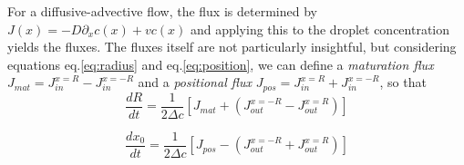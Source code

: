 \documentclass{Dissertate}
\begin{document}
For a diffusive-advective flow, the flux is determined by
\(J(x) = -D\partial_xc(x)+vc(x)\) and applying this to the droplet
concentration yields the fluxes. The fluxes itself are not particularly
insightful, but considering equations eq.\ref{eq:radius} and
eq.\ref{eq:position}, we can define a \emph{maturation flux}
\(J_{mat} = J_{in}^{x=R}-J_{in}^{x=-R}\) and a \emph{positional flux}
\(J_{pos} = J_{in}^{x=R}+J_{in}^{x=-R}\), so that \begin{equation}
\frac{dR}{dt}=\frac{1}{2\Delta c}\left[J_{mat}+(J_{out}^{x=-R}-J_{out}^{x=R})\right]
\label{eq:drdtalt}\end{equation}

\begin{equation}
\frac{dx_0}{dt}=\frac{1}{2\Delta c}\left[J_{pos}-(J_{out}^{x=-R}+J_{out}^{x=R})\right]
\label{eq:dxdtalt}\end{equation}
\end{document}
